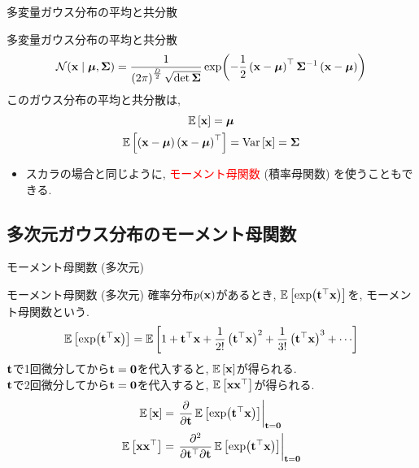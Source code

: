 \documentclass[dvipdfmx,notheorems,t]{beamer}
\begin{document}
\begin{frame}{多変量ガウス分布の平均と共分散}
\begin{block}{多変量ガウス分布の平均と共分散}
  \begin{align*}
    \mathcal{N}(\vb{x} \mid \vb*{\mu}, \vb{\Sigma})
    = \frac{1}{\left( 2\pi \right)^\frac{D}{2} \sqrt{\det \vb{\Sigma}}}
    \exp(-\frac{1}{2} \left( \vb{x} - \vb*{\mu} \right)^\top \vb{\Sigma}^{-1}
      \left( \vb{x} - \vb*{\mu} \right))
  \end{align*}
  このガウス分布の平均と共分散は,
  \begin{gather*}
    \operatorname{\mathbb{E}} \left[ \vb{x} \right] = \vb*{\mu} \\
    \operatorname{\mathbb{E}} \left[ \left( \vb{x} - \vb*{\mu} \right) \left( \vb{x} - \vb*{\mu} \right)^\top \right]
      = \operatorname{Var} \left[ \vb{x} \right] = \vb{\Sigma}
  \end{gather*}
\end{block}

\begin{itemize}
  \item スカラの場合と同じように, \textcolor{red}{モーメント母関数} (積率母関数) を使うこともできる.
\end{itemize}
\end{frame}

\subsection{多次元ガウス分布のモーメント母関数}

\begin{frame}{モーメント母関数 (多次元)}
\begin{block}{モーメント母関数 (多次元)}
  確率分布$p(\vb{x})$があるとき, $\operatorname{\mathbb{E}} \left[ \exp(\vb{t}^\top \vb{x}) \right]$を, モーメント母関数という.
  \begin{align*}
    \E{\exp(\vb{t}^\top \vb{x})} = \E{1 + \vb{t}^\top \vb{x}
      + \frac{1}{2!} \left( \vb{t}^\top \vb{x} \right)^2
      + \frac{1}{3!} \left( \vb{t}^\top \vb{x} \right)^3 + \cdots}
  \end{align*}
  $\vb{t}$で1回微分してから$\vb{t} = \vb{0}$を代入すると, $\operatorname{\mathbb{E}} \left[ \vb{x} \right]$が得られる. \\
  $\vb{t}$で2回微分してから$\vb{t} = \vb{0}$を代入すると, $\operatorname{\mathbb{E}} \left[ \vb{x} \vb{x}^\top \right]$が得られる.
  \begin{align*}
    \operatorname{\mathbb{E}} \left[ \vb{x} \right] &= \left. \pdv{\vb{t}}
      \operatorname{\mathbb{E}} \left[ \exp(\vb{t}^\top \vb{x}) \right] \right|_{\vb{t} = \vb{0}} \\
    \operatorname{\mathbb{E}} \left[ \vb{x} \vb{x}^\top \right] &= \left. \frac{\partial^2}{\partial \vb{t}^\top \partial \vb{t}}
      \operatorname{\mathbb{E}} \left[ \exp(\vb{t}^\top \vb{x}) \right] \right|_{\vb{t} = \vb{0}}
  \end{align*}
\end{block}
\end{frame}
\end{document}
